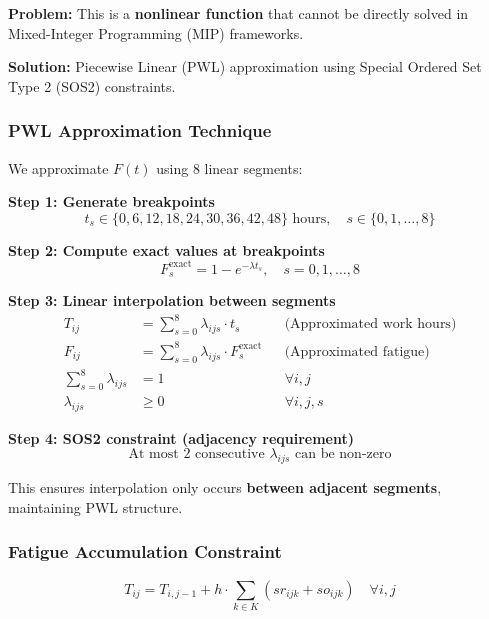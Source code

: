 \documentclass[11pt,letterpaper]{article}
\begin{document}
\textbf{Problem:} This is a \textbf{nonlinear function} that cannot be directly solved in Mixed-Integer Programming (MIP) frameworks.

\textbf{Solution:} Piecewise Linear (PWL) approximation using Special Ordered Set Type 2 (SOS2) constraints.

\subsubsection{PWL Approximation Technique}
We approximate $F(t)$ using 8 linear segments:

\textbf{Step 1: Generate breakpoints}
\begin{equation}
t_s \in \{0, 6, 12, 18, 24, 30, 36, 42, 48\} \text{ hours}, \quad s \in \{0, 1, \ldots, 8\}
\end{equation}

\textbf{Step 2: Compute exact values at breakpoints}
\begin{equation}
F_s^{\text{exact}} = 1 - e^{-\lambda t_s}, \quad s = 0, 1, \ldots, 8
\end{equation}

\textbf{Step 3: Linear interpolation between segments}
\begin{align}
T_{ij} &= \sum_{s=0}^{8} \lambda_{ijs} \cdot t_s && \text{(Approximated work hours)} \tag{F3} \\
F_{ij} &= \sum_{s=0}^{8} \lambda_{ijs} \cdot F_s^{\text{exact}} && \text{(Approximated fatigue)} \tag{F4} \\
\sum_{s=0}^{8} \lambda_{ijs} &= 1 && \forall i, j \tag{F2: Convexity} \\
\lambda_{ijs} &\geq 0 && \forall i, j, s \tag{Non-negativity}
\end{align}

\textbf{Step 4: SOS2 constraint (adjacency requirement)}
\begin{equation}
\text{At most 2 consecutive } \lambda_{ijs} \text{ can be non-zero} \tag{F5}
\end{equation}

This ensures interpolation only occurs \textbf{between adjacent segments}, maintaining PWL structure.

\subsubsection{Fatigue Accumulation Constraint}
\begin{equation}
T_{ij} = T_{i,j-1} + h \cdot \sum_{k \in K} (sr_{ijk} + so_{ijk}) \quad \forall i, j \tag{F1}
\end{equation}
\end{document}
